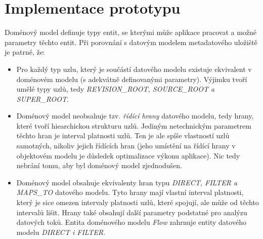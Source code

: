 \chapter{Implementace prototypu}

Doménový model definuje typy entit, se kterými může aplikace pracovat a možné parametry těchto entit. Při porovnání s datovým modelem metadatového uložiště je patrné, že:

\begin{itemize}
   \item{} Pro každý typ uzlu, který je součástí datového modelu existuje ekvivalent v doménovém modelu (s adekvátně definovanými parametry). Výjimku tvoří umělé typy uzlů, tedy \textit{REVISION\_ROOT, SOURCE\_ROOT a SUPER\_ROOT}.
   \item{} Doménový model neobsahuje tzv. \textit{řídící hrany} datového modelu, tedy hrany, které tvoří hiearchickou strukturu uzlů. Jediným netechnickým parametrem těchto hran je interval platnosti uzlů. Ten je ale spíše vlastností uzlů samotných, nikoliv jejich řídících hran (jeho umístění na řídící hrany v objektovém modelu je důsledek optimalizace výkonu aplikace). Nic tedy nebrání tomu, aby byl doménový model zjednodušen.
   \item{} Doménový model obsahuje ekvivalenty hran typu \textit{DIRECT, FILTER a MAPS\_TO} datového modelu. Tyto hrany mají vlastní interval platnosti, který je sice omezen intervaly platnosti uzlů, které spojují, ale může od těchto intervalů lišit. Hrany také obsahují další parametry podstatné pro analýzu datových toků. Entita doménového modelu \textit{Flow} zahrnuje entity datového modelu \textit{DIRECT i FILTER}.
\end{itemize}

% 
